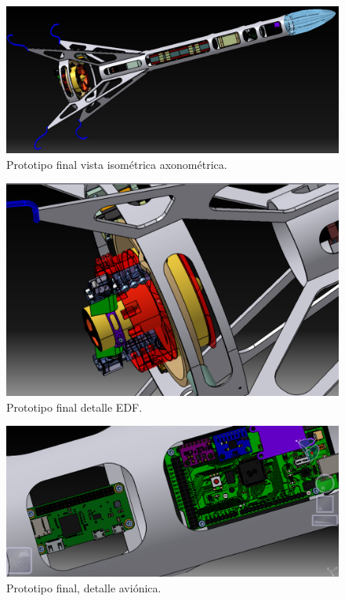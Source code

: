 \begin{figure}[htb]
    \centering
    \includegraphics[width=\linewidth]{fig/design/v6_2}
    \caption{Prototipo final vista isométrica axonométrica.}
    \label{fig:design/v6_2}
\end{figure}

\begin{figure}[htb]
    \centering
    \includegraphics[width=\linewidth]{fig/design/v6_3}
    \caption{Prototipo final detalle EDF.}
    \label{fig:design/v6_3}
\end{figure}

\begin{figure}[htb]
    \centering
    \includegraphics[width=\linewidth]{fig/design/v6_4}
    \caption{Prototipo final, detalle aviónica.}
    \label{fig:design/v6_4}
\end{figure}


